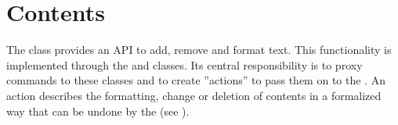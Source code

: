 



\section{Contents}
\label{sec:contents_impl}

The  class provides an API to add, remove and format text. This functionality is implemented through the  and  classes. Its central responsibility is to proxy commands to these classes and to create ''actions'' to pass them on to the . An action describes the formatting, change or deletion of contents in a formalized way that can be undone by the  (see ).




